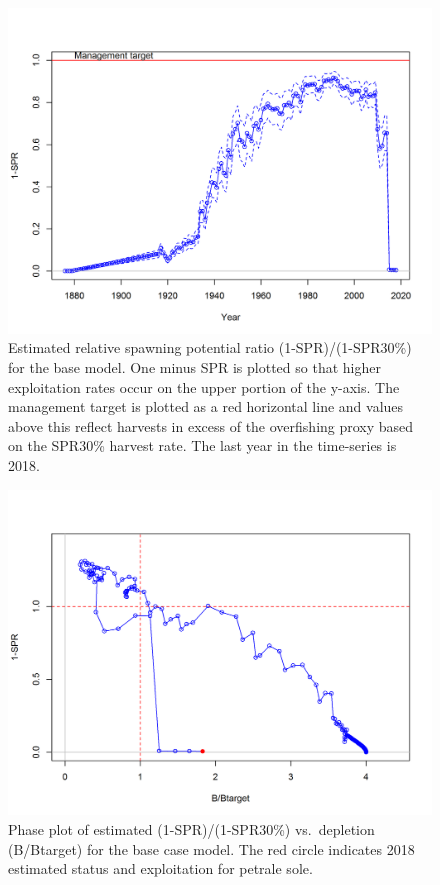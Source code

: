 \documentclass[12pt,]{article}
\begin{document}
\begin{figure}
\centering
\includegraphics{r4ss/plots_mod1/SPR3_ratiointerval.png}
\caption{Estimated relative spawning potential ratio (1-SPR)/(1-SPR30\%)
for the base model. One minus SPR is plotted so that higher exploitation
rates occur on the upper portion of the y-axis. The management target is
plotted as a red horizontal line and values above this reflect harvests
in excess of the overfishing proxy based on the SPR30\% harvest rate.
The last year in the time-series is 2018. \label{fig:SPR_all}}
\end{figure}

\begin{figure}
\centering
\includegraphics{r4ss/plots_mod1/SPR4_phase.png}
\caption{Phase plot of estimated (1-SPR)/(1-SPR30\%) vs.~depletion
(B/Btarget) for the base case model. The red circle indicates 2018
estimated status and exploitation for petrale sole.
\label{fig:Phase_all}}
\end{figure}
\end{document}
